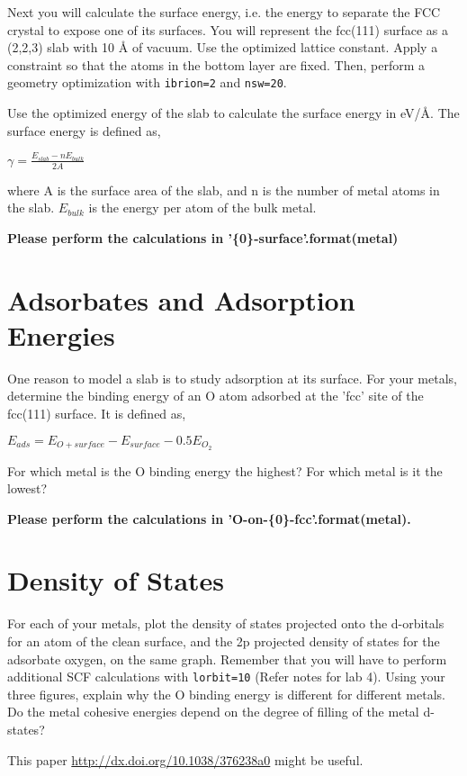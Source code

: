 \documentclass[11pt]{article}
\begin{document}
Next you will calculate the surface energy, i.e. the energy to separate the FCC crystal to expose one of its surfaces. You will represent the fcc(111) surface as a (2,2,3) slab with 10 \AA{} of vacuum. Use the optimized lattice constant. Apply a constraint so that the atoms in the bottom layer are fixed. Then, perform a geometry optimization with \verb~ibrion=2~ and \verb~nsw=20~.

Use the optimized energy of the slab to calculate the surface energy in eV/\AA{}. The surface energy is defined as,

$\gamma = \frac{E_{slab} - nE_{bulk}}{2A}$

where A is the surface area of the slab, and n is the number of metal atoms in the slab. $E_{bulk}$ is the energy per atom of the bulk metal.

\textbf{Please perform the calculations in '\{0\}-surface'.format(metal)}

\section{Adsorbates and Adsorption Energies}
\label{sec-6}

One reason to model a slab is to study adsorption at its surface.  For your metals, determine the binding energy of an O atom adsorbed at the 'fcc' site of the fcc(111) surface. It is defined as,

$E_{ads} = E_{O+surface} - E_{surface} - 0.5 E_{O_{2}}$

For which metal is the O binding energy the highest? For which metal is it the lowest?

\textbf{Please perform the calculations in 'O-on-\{0\}-fcc'.format(metal).}

\section{Density of States}
\label{sec-7}
For each of your metals, plot the density of states projected onto the d-orbitals for an atom of the clean surface, and the 2p projected density of states for the adsorbate oxygen, on the same graph. Remember that you will have to perform additional SCF calculations with \verb~lorbit=10~ (Refer notes for lab 4). Using your three figures, explain why the O binding energy is different for different metals. Do the metal cohesive energies depend on the degree of filling of the metal d-states?

This paper \url{http://dx.doi.org/10.1038/376238a0} might be useful.
\end{document}

